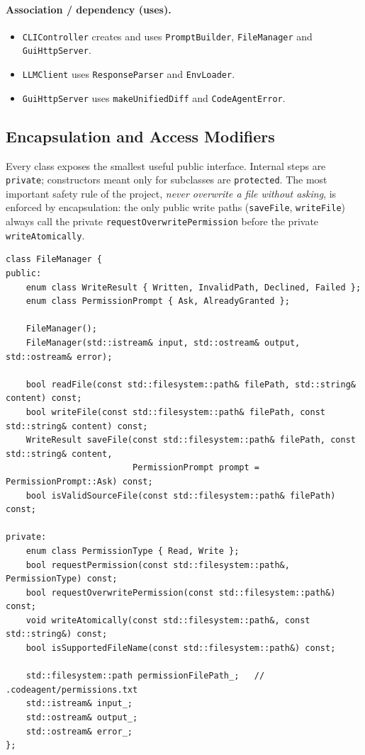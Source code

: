 \documentclass[12pt,a4paper,oneside]{book}
\begin{document}
\paragraph{Association / dependency (uses).}
\begin{itemize}
  \item \texttt{CLIController} creates and uses \texttt{PromptBuilder},
    \texttt{FileManager} and \texttt{GuiHttpServer}.
  \item \texttt{LLMClient} uses \texttt{ResponseParser} and
    \texttt{EnvLoader}.
  \item \texttt{GuiHttpServer} uses \texttt{makeUnifiedDiff} and
    \texttt{CodeAgentError}.
\end{itemize}

\subsection{Encapsulation and Access Modifiers}

Every class exposes the smallest useful public interface. Internal steps are
\texttt{private}; constructors meant only for subclasses are
\texttt{protected}. The most important safety rule of the project, \emph{never
overwrite a file without asking}, is enforced by encapsulation: the only public
write paths (\texttt{saveFile}, \texttt{writeFile}) always call the private
\texttt{requestOverwritePermission} before the private
\texttt{writeAtomically}.

\begin{lstlisting}[style=codeagentcpp,caption={Access modifiers in \texttt{FileManager} (abridged)},label={lst:ca-fm}]
class FileManager {
public:
    enum class WriteResult { Written, InvalidPath, Declined, Failed };
    enum class PermissionPrompt { Ask, AlreadyGranted };

    FileManager();
    FileManager(std::istream& input, std::ostream& output, std::ostream& error);

    bool readFile(const std::filesystem::path& filePath, std::string& content) const;
    bool writeFile(const std::filesystem::path& filePath, const std::string& content) const;
    WriteResult saveFile(const std::filesystem::path& filePath, const std::string& content,
                         PermissionPrompt prompt = PermissionPrompt::Ask) const;
    bool isValidSourceFile(const std::filesystem::path& filePath) const;

private:
    enum class PermissionType { Read, Write };
    bool requestPermission(const std::filesystem::path&, PermissionType) const;
    bool requestOverwritePermission(const std::filesystem::path&) const;
    void writeAtomically(const std::filesystem::path&, const std::string&) const;
    bool isSupportedFileName(const std::filesystem::path&) const;

    std::filesystem::path permissionFilePath_;   // .codeagent/permissions.txt
    std::istream& input_;
    std::ostream& output_;
    std::ostream& error_;
};
\end{lstlisting}
\end{document}

